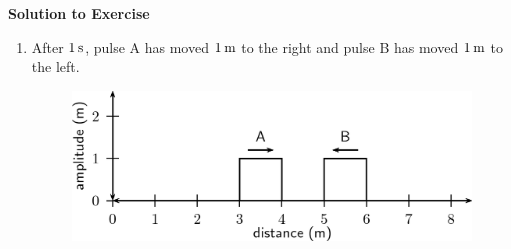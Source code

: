 {\begin{mdframed}[linewidth=4, leftmargin=40, rightmargin=40]
\begin{exercise}
    \addtocounter{footnote}{-0}
    
      \par 
      
      \vspace{5pt}
      \label{m38802*solfhsst!!!underscore!!!id601}\noindent\textbf{Solution to Exercise } \label{m38802*listfhsst!!!underscore!!!id601}\begin{enumerate}[noitemsep, label=\textbf{Step} \textbf{\arabic*}. ] 
            \leftskip=20pt\rightskip=\leftskip\item  
      \label{m38802*id316313}After \begin{math}1\phantom{\rule{2pt}{0ex}}\mathrm{s}\end{math}, pulse A has moved \begin{math}1\phantom{\rule{2pt}{0ex}}\mathrm{m}\end{math} to the right and pulse B has moved \begin{math}1\phantom{\rule{2pt}{0ex}}\mathrm{m}\end{math} to the left.\par 
      \label{m38802*id316318}
        
    \setcounter{subfigure}{0}


	\begin{figure}[H] %
    \begin{center}
    \label{m38802*id316321!!!underscore!!!media}\label{m38802*id316321!!!underscore!!!printimage}\includegraphics{col11305.imgs/m38802_PG10C4_021.png} %
        
      \vspace{2pt}
    \vspace{.1in}
    
    \end{center}

 \end{figure}   

    \addtocounter{footnote}{-0}
    

\end{enumerate}
\end{exercise}
\end{mdframed}}

